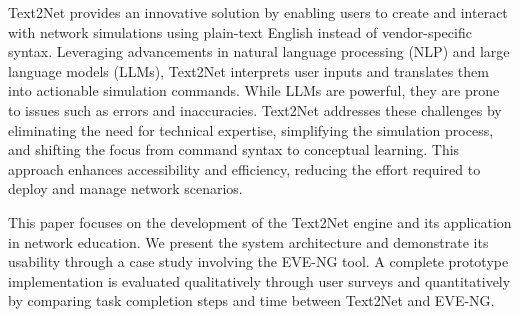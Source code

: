 \vspace{1mm}
Text2Net provides an innovative solution by enabling users to create and interact with network simulations using plain-text English instead of vendor-specific syntax. Leveraging advancements in natural language processing (NLP) and large language models (LLMs), Text2Net interprets user inputs and translates them into actionable simulation commands. While LLMs are powerful, they are prone to issues such as errors and inaccuracies. Text2Net addresses these challenges by eliminating the need for technical expertise, simplifying the simulation process, and shifting the focus from command syntax to conceptual learning. This approach enhances accessibility and efficiency, reducing the effort required to deploy and manage network scenarios.

This paper focuses on the development of the Text2Net engine and its application in network education. We present the system architecture and demonstrate its usability through a case study involving the EVE-NG tool. A complete prototype implementation is evaluated qualitatively through user surveys and quantitatively by comparing task completion steps and time between Text2Net and EVE-NG.

